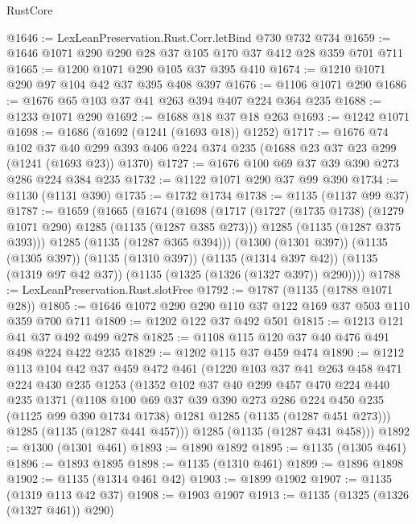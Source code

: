 \begin{lexlean}{RustCore}
\begin{coremodule}
@1646 := LexLeanPreservation.Rust.Corr.letBind @730 @732 @734
@1659 := @1646 @1071 @290 @290 @28 @37 @105 @170 @37 @412 @28 @359 @701 @711
@1665 := @1200 @1071 @290 @105 @37 @395 @410
@1674 := @1210 @1071 @290 @97 @104 @42 @37 @395 @408 @397
@1676 := @1106 @1071 @290
@1686 := @1676 @65 @103 @37 @41 @263 @394 @407 @224 @364 @235
@1688 := @1233 @1071 @290
@1692 := @1688 @18 @37 @18 @263
@1693 := @1242 @1071
@1698 := @1686 (@1692 (@1241 (@1693 @18)) @1252)
@1717 := @1676
    @74
    @102
    @37
    @40
    @299
    @393
    @406
    @224
    @374
    @235
    (@1688 @23 @37 @23 @299 (@1241 (@1693 @23)) @1370)
@1727 := @1676 @100 @69 @37 @39 @390 @273 @286 @224 @384 @235
@1732 := @1122 @1071 @290 @37 @99 @390
@1734 := @1130 (@1131 @390)
@1735 := @1732 @1734
@1738 := @1135 (@1137 @99 @37)
@1787 := @1659
    (@1665
      (@1674
        (@1698
          (@1717
            (@1727 (@1735 @1738) (@1279 @1071 @290) @1285 (@1135 (@1287 @385 @273)))
            @1285
            (@1135 (@1287 @375 @393)))
          @1285
          (@1135 (@1287 @365 @394)))
        (@1300 (@1301 @397))
        (@1135 (@1305 @397))
        (@1135 (@1310 @397))
        (@1135 (@1314 @397 @42))
        (@1135 (@1319 @97 @42 @37))
        (@1135 (@1325 (@1326 (@1327 @397)) @290))))
@1788 := LexLeanPreservation.Rust.slotFree
@1792 := @1787 (@1135 (@1788 @1071 @28))
@1805 := @1646 @1072 @290 @290 @110 @37 @122 @169 @37 @503 @110 @359 @700 @711
@1809 := @1202 @122 @37 @492 @501
@1815 := @1213 @121 @41 @37 @492 @499 @278
@1825 := @1108 @115 @120 @37 @40 @476 @491 @498 @224 @422 @235
@1829 := @1202 @115 @37 @459 @474
@1890 := @1212
    @113
    @104
    @42
    @37
    @459
    @472
    @461
    (@1220
      @103
      @37
      @41
      @263
      @458
      @471
      @224
      @430
      @235
      @1253
      (@1352
        @102
        @37
        @40
        @299
        @457
        @470
        @224
        @440
        @235
        @1371
        (@1108
          @100
          @69
          @37
          @39
          @390
          @273
          @286
          @224
          @450
          @235
          (@1125 @99 @390 @1734 @1738)
          @1281
          @1285
          (@1135 (@1287 @451 @273)))
        @1285
        (@1135 (@1287 @441 @457)))
      @1285
      (@1135 (@1287 @431 @458)))
@1892 := @1300 (@1301 @461)
@1893 := @1890 @1892
@1895 := @1135 (@1305 @461)
@1896 := @1893 @1895
@1898 := @1135 (@1310 @461)
@1899 := @1896 @1898
@1902 := @1135 (@1314 @461 @42)
@1903 := @1899 @1902
@1907 := @1135 (@1319 @113 @42 @37)
@1908 := @1903 @1907
@1913 := @1135 (@1325 (@1326 (@1327 @461)) @290)

\end{coremodule}
\end{lexlean}
